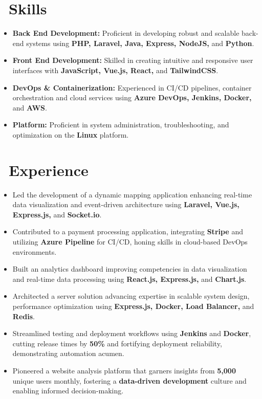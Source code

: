 \documentclass{resume}
\begin{document}



\section{\faCogs\ Skills}
\begin{itemize}[parsep=0.5ex]
  \item \textbf{Back End Development:} Proficient in developing robust and scalable back-end systems using \textbf{PHP, Laravel, Java, Express, NodeJS,} and \textbf{Python}.
  \item \textbf{Front End Development:} Skilled in creating intuitive and responsive user interfaces with \textbf{JavaScript, Vue.js, React,} and \textbf{TailwindCSS}.
  \item \textbf{DevOps \& Containerization:} Experienced in CI/CD pipelines, container orchestration and cloud services using \textbf{Azure DevOps, Jenkins, Docker,} and \textbf{AWS}.
  \item \textbf{Platform:} Proficient in system administration, troubleshooting, and optimization on the \textbf{Linux} platform.
\end{itemize}

\section{\faUsers\ Experience}
\role{Software Developer}{Full-time}
\begin{itemize}
  \item Led the development of a dynamic mapping application enhancing real-time data visualization and event-driven architecture using \textbf{Laravel, Vue.js, Express.js,} and \textbf{Socket.io}.
  \item Contributed to a payment processing application, integrating \textbf{Stripe} and utilizing \textbf{Azure Pipeline} for CI/CD, honing skills in cloud-based DevOps environments.
  \item Built an analytics dashboard improving competencies in data visualization and real-time data processing using \textbf{React.js, Express.js,} and \textbf{Chart.js}.
  \item Architected a server solution advancing expertise in scalable system design, performance optimization using \textbf{Express.js, Docker, Load Balancer,} and \textbf{Redis}.
  \item Streamlined testing and deployment workflows using \textbf{Jenkins} and \textbf{Docker}, cutting release times by \textbf{50\%} and fortifying deployment reliability, demonstrating automation acumen.
  \item Pioneered a website analysis platform that garners insights from \textbf{5,000} unique users monthly, fostering a \textbf{data-driven development} culture and enabling informed decision-making.
 \end{itemize}
\end{document}
